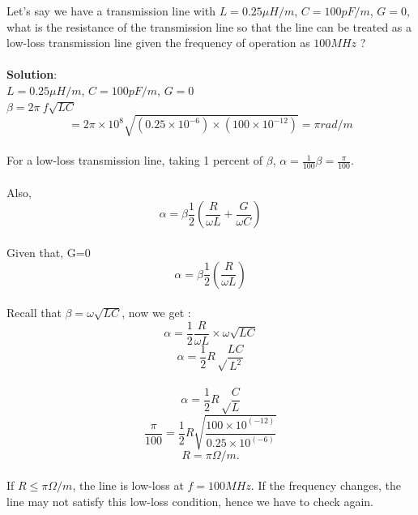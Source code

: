 \begin{exmp}
Let's say we have a transmission line with $L = 0.25\mu H/m$, ${C= 100pF/m}$, $G = 0$, what is the resistance of the transmission line so that the line can be treated as a low-loss transmission line given the frequency of operation as $100MHz$ ?\\\\
\textbf{Solution}:\\
$L= 0.25\mu H/m$, $C= 100pF/m$, $G = 0$\\
$\beta = 2\pi \ f {\sqrt{LC}}$
\begin{equation*}
=2 \pi \times 10^8 \sqrt{(0.25 \times 10^{-6}) \times (100 \times 10^{-12})}  = \pi rad/m
\end{equation*}\\
 For a low-loss transmission line, taking 1 percent of $\beta$,
$ \alpha= \frac{1}{100} \beta = \frac{\pi}{100}$.\\\\
Also,
\begin{equation*}
\alpha = \beta\frac{1}{2} ( \frac{R}{\omega L} + \frac{G}{\omega C})
\end{equation*}\\
Given that, G=0\\
\begin{equation*}
\alpha = \beta\frac{1}{2} ( \frac{R}{\omega L} )
\end{equation*}\\
Recall that $\beta = \omega\sqrt{LC} $, now we get :
\begin{equation*}
\alpha = \frac{1}{2}\frac{R}{\omega L} \times \omega\sqrt{LC} 
\end{equation*}
\begin{equation*}
\alpha = \frac{1}{2} R \sqrt \frac{LC}{L^{2}} 
\end{equation*}\\
\begin{equation*}
\alpha = \frac{1}{2} R \sqrt \frac{C}{L}
\end{equation*}
\begin{equation*}
\frac{\pi}{100} = \frac{1}{2} R \sqrt{\frac{100 \times 10^{(-12)}}{0.25 \times 10^{(-6)}}}
\end{equation*}
\begin{equation*}
 R=\pi\Omega/m.
\end{equation*}\\
 If $R \leq \pi\Omega/m$, the line is low-loss at $ f= 100MHz$. If the frequency changes, the line may not satisfy this low-loss condition, hence we have to check again.
\end{exmp}


